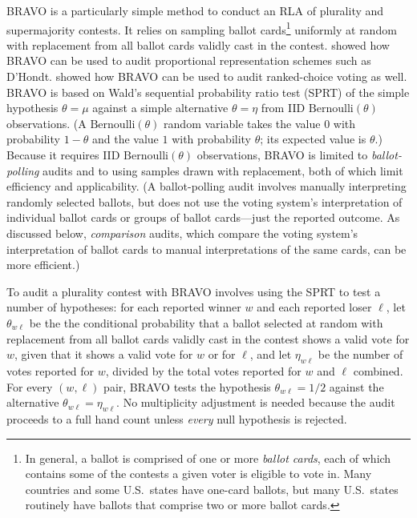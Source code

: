 \documentclass[aoas]{imsart}
\newcommand{\Bern}{\ensuremath{\mathrm{Bernoulli}}}
\begin{document}
BRAVO \citep{lindemanEtal12} is a particularly
simple method to conduct an RLA of plurality and supermajority contests.
It relies on sampling ballot cards\footnote{%
In general, a ballot is comprised of one or more \emph{ballot cards}, each of which contains some of the contests
a given voter is eligible to vote in.
Many countries and some U.S.\ states have one-card ballots, but many U.S.\ states routinely
have ballots that comprise two or more
ballot cards.
}  
uniformly at random with replacement from all ballot cards validly cast in the contest.
\citet{starkTeague14} showed how BRAVO can be used to audit proportional representation schemes such as D'Hondt.
\citet{blomEtal18} showed how BRAVO can be used to audit ranked-choice voting as well.
BRAVO is based on Wald's \citep{wald45} sequential probability ratio test (SPRT) of the simple hypothesis 
$\theta = \mu$ against a simple alternative $\theta = \eta$ from IID $\Bern(\theta)$ observations.
(A $\Bern(\theta)$ random variable takes the value $0$ with probability $1-\theta$ and the value $1$ with probability $\theta$;
its expected value is $\theta$.)
Because it requires IID $\Bern(\theta)$ observations, BRAVO is limited to \emph{ballot-polling} audits and to using samples drawn with 
replacement, both of which limit efficiency and applicability.
(A ballot-polling audit involves manually interpreting randomly selected ballots, but does not use the voting system's
interpretation of individual ballot cards or groups of ballot cards---just the reported outcome.
As discussed below, \emph{comparison} audits, which compare the voting system's interpretation of ballot cards to
manual interpretations of the same cards, can be more efficient.)

To audit a plurality contest with BRAVO involves using the SPRT to test a number of hypotheses:
for each reported winner $w$ and each reported loser $\ell$, let $\theta_{w\ell}$ be the 
the conditional probability that a ballot selected at random with replacement
from all ballot cards validly cast in the contest shows a valid vote for $w$, given that it shows a valid vote for $w$ or for $\ell$,
and let $\eta_{w\ell}$ be the number of votes reported for $w$, divided by the total votes reported for $w$ and $\ell$ combined.
For every  $(w, \ell)$ pair,
BRAVO tests the hypothesis $\theta_{w\ell} = 1/2$ against the alternative $\theta_{w\ell} = \eta_{w\ell}$.
No multiplicity adjustment is needed because the audit proceeds to a full hand count unless \emph{every} null hypothesis
is rejected.
\end{document}
